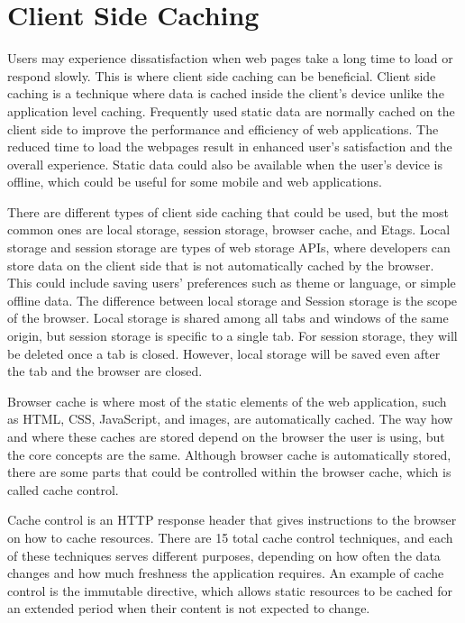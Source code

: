 \section[Client Side Caching]{Client Side Caching}
\label{sec:clientside_caching}
Users may experience dissatisfaction when web pages take a long time to load or respond slowly.
This is where client side caching can be beneficial.
Client side caching is a technique where data is cached inside the client's device unlike the application level caching.
Frequently used static data are normally cached on the client side to improve the performance and efficiency of
web applications. The reduced time to load the webpages result in enhanced user's satisfaction and the overall experience.
Static data could also be available when the user's device is offline, which could be useful for some mobile and web applications. 



There are different types of client side caching that could be used, but the most common ones are local storage, session storage, browser cache, and Etags.
Local storage and session storage are types of web storage APIs, where developers can store data on the client side that is not automatically cached by the browser.
This could include saving users' preferences such as theme or language, or simple offline data. The difference between local storage and 
Session storage is the scope of the browser. Local storage is shared among all tabs and windows of the same origin, but session storage is specific to a single tab.
For session storage, they will be deleted once a tab is closed. However, local storage will be saved even after the tab and the browser are closed.

Browser cache is where most of the static elements of the web application, such as HTML, CSS, JavaScript, and images, are automatically cached.
The way how and where these caches are stored depend on the browser the user is using, but the core concepts are the same.
Although browser cache is automatically stored, there are some parts that could be controlled within the browser cache, which is called cache control.

Cache control is an HTTP response header that gives instructions to the browser on how to cache resources. 
There are 15 total cache control techniques, and each of these techniques serves different purposes,
depending on how often the data changes and how much freshness the application requires.
An example of cache control is the immutable directive,
which allows static resources to be cached for an extended period when their content is not expected to change.

